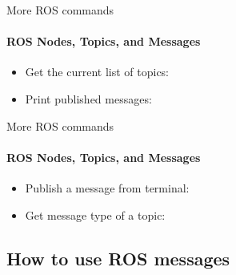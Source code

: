 \documentclass{beamer}
\begin{document}
\begin{frame}{More ROS commands}
    \framesubtitle{ROS Nodes, Topics, and Messages}
    \begin{itemize}
        \item Get the current list of topics:
        
        \begin{terminal}
            \color{green} 
        \end{terminal}
        
        \item Print published messages:
        
        \begin{terminal}
            \color{green} 
        \end{terminal}
        
     \end{itemize}
     
\end{frame}


\begin{frame}{More ROS commands}
    \framesubtitle{ROS Nodes, Topics, and Messages}
    \begin{itemize}
                
        \item Publish a message from terminal:
        
        \begin{terminal}
            \color{green} 
        \end{terminal}        
        
        
        \item Get message type of a topic:
        
        \begin{terminal}
            \color{green} 
        \end{terminal}
  
  
    \end{itemize}
    
\end{frame}




\subsection{How to use ROS messages}
\end{document}

